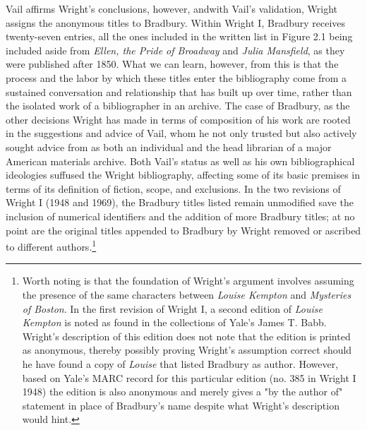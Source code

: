 Vail affirms Wright's conclusions, however, andwith Vail's validation, Wright assigns the anonymous titles to Bradbury.\autocite{robert_g._vail_letter_1938} Within Wright I, Bradbury receives twenty-seven entries, all the ones included in the written list in Figure 2.1 being included aside from \textit{Ellen, the Pride of Broadway} and \textit{Julia Mansfield}, as they were published after 1850. What we can learn, however, from this is that the process and the labor by which these titles enter the bibliography come from a sustained conversation and relationship that has built up over time, rather than the isolated work of a bibliographer in an archive. The case of Bradbury, as the other decisions Wright has made in terms of composition of his work are rooted in the suggestions and advice of Vail, whom he not only trusted but also actively sought advice from as both an individual and the head librarian of a major American materials archive. Both Vail's status as well as his own bibliographical ideologies suffused the Wright bibliography, affecting some of its basic premises in terms of its definition of fiction, scope, and exclusions. In the two revisions of Wright I (1948 and 1969), the Bradbury titles listed remain unmodified save the inclusion of numerical identifiers and the addition of more Bradbury titles; at no point are the original titles appended to Bradbury by Wright removed or ascribed to different authors.\footnote{Worth noting is that the foundation of Wright's argument involves assuming the presence of the same characters between \textit{Louise Kempton} and \textit{Mysteries of Boston}. In the first revision of Wright I, a second edition of \textit{Louise Kempton} is noted as found in the collections of Yale's James T. Babb. Wright's description of this edition does not note that the edition is printed as anonymous, thereby possibly proving Wright's assumption correct should he have found a copy of \textit{Louise} that listed Bradbury as author. However, based on Yale's MARC record for this particular edition (no. 385 in Wright I 1948) the edition is also anonymous and merely gives a "by the author of" statement in place of Bradbury's name despite what Wright's description would hint.}

